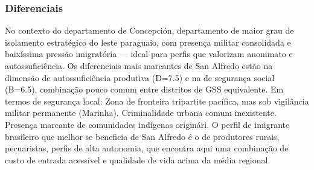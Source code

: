 \subsubsection*{Diferenciais}\label{dif-san-alfredo-0110}
No contexto do departamento de Concepción, departamento de maior grau de isolamento estratégico do leste paraguaio, com presença militar consolidada e baixíssima pressão imigratória — ideal para perfis que valorizam anonimato e autossuficiência. Os diferenciais mais marcantes de San Alfredo estão na dimensão de autossuficiência produtiva (D=7.5) e na de segurança social (B=6.5), combinação pouco comum entre distritos de GSS equivalente. Em termos de segurança local: Zona de fronteira tripartite pacífica, mas sob vigilância militar permanente (Marinha). Criminalidade urbana comum inexistente. Presença marcante de comunidades indígenas originári. O perfil de imigrante brasileiro que melhor se beneficia de San Alfredo é o de produtores rurais, pecuaristas, perfis de alta autonomia, que encontra aqui uma combinação de custo de entrada acessível e qualidade de vida acima da média regional.
